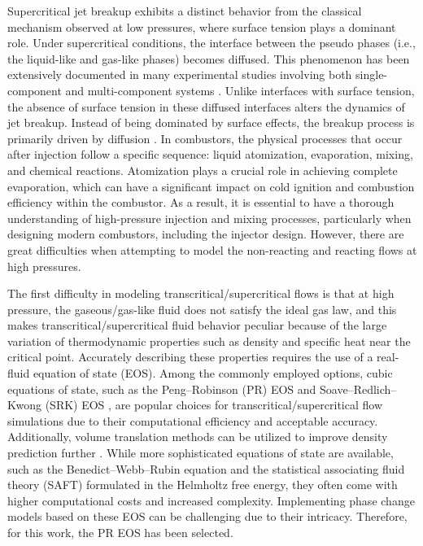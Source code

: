Supercritical jet breakup exhibits a distinct behavior from the classical mechanism observed at low pressures, where surface tension plays a dominant role. Under supercritical conditions, the interface between the pseudo phases (i.e., the liquid-like and gas-like phases) becomes diffused. This phenomenon has been extensively documented in many experimental studies involving both single-component \cite{mayer1998atomization,chehroudi2002visual,candel2006structure,oschwald2006injection,roy2013disintegrating} and multi-component systems \cite{mayer1998atomization,chehroudi2002visual,candel2006structure,oschwald2006injection,roy2013disintegrating}. Unlike interfaces with surface tension, the absence of surface tension in these diffused interfaces alters the dynamics of jet breakup.
Instead of being dominated by surface effects, the breakup process is primarily driven by diffusion \cite{chehroudi1999initial,smith2004fundamentals}. 
In combustors, the physical processes that occur after injection follow a specific sequence: liquid atomization, evaporation, mixing, and chemical reactions. Atomization plays a crucial role in achieving complete evaporation, which can have a significant impact on cold ignition and combustion efficiency within the combustor. As a result, it is essential to have a thorough understanding of high-pressure injection and mixing processes, particularly when designing modern combustors, including the injector design. However, there are great difficulties when attempting to model the non-reacting and reacting flows at high pressures. 


The first difficulty in modeling transcritical/supercritical flows is that at high pressure, the gaseous/gas-like fluid does not satisfy the ideal gas law, and this makes transcritical/supercritical fluid behavior peculiar because of the large variation of thermodynamic properties such as density and specific heat near the critical point. Accurately describing these properties requires the use of a real-fluid equation of state (EOS). Among the commonly employed options, cubic equations of state, such as the Peng–Robinson (PR) EOS \cite{peng1976new} and Soave–Redlich–Kwong (SRK) EOS \cite{soave1972equilibrium}, are popular choices for transcritical/supercritical flow simulations due to their computational efficiency and acceptable accuracy. Additionally, volume translation methods can be utilized to improve density prediction further \cite{muller2016large}. While more sophisticated equations of state are available, such as the Benedict–Webb–Rubin equation \cite{benedict1940empirical} and the statistical associating fluid theory (SAFT) \cite{gross2001perturbed} formulated in the Helmholtz free energy, they often come with higher computational costs and increased complexity. Implementing phase change models based on these EOS can be challenging due to their intricacy. 
Therefore, for this work, the PR EOS has been selected.

